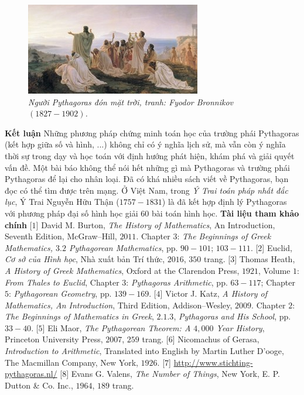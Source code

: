 \begin{multicols}{2}
\begin{figure}[H]
		\centering
		\captionsetup{labelformat= empty, justification=centering}
		\includegraphics[width= 1\linewidth]{17}
		\caption{\small\textit{\color{lichsutoanhoc}Người Pythagoras đón mặt trời, 
				tranh: Fyodor Bronnikov $(1827-1902)$.}}
		\vspace*{-10pt}
	\end{figure}
	\textbf{\color{lichsutoanhoc}Kết luận}
	\vskip 0.1cm
	Những phương pháp chứng minh toán học của trường phái Pythagoras (kết hợp giữa số và hình, ...) không chỉ có ý nghĩa lịch sử, mà vẫn còn ý nghĩa thời sự trong dạy và học toán với định hướng phát hiện, khám phá và giải quyết vấn đề. Một bài báo không thể nói hết những gì mà Pythagoras và trường phái Pythagoras để lại cho nhân loại. Đã có khá nhiều sách viết về Pythagoras, bạn đọc có thể tìm được trên mạng. 
	\vskip 0.1cm 
	Ở Việt Nam, trong \textit{Ý Trai toán pháp nhất đắc lục}, Ý Trai Nguyễn Hữu Thận ($1757-1831$) là đã kết hợp định lý Pythagoras với phương pháp đại số hình học giải $60$ bài toán hình học. 
	\vskip 0.1cm
	\textbf{\color{lichsutoanhoc}Tài liệu tham khảo chính}
	\vskip 0.1cm
	[$1$] David M. Burton, \textit{The History of Mathematics}, An Introduction, Seventh Edition, McGraw--Hill, $2011$. Chapter $3$: \textit{The Beginnings of Greek Mathematics, $3.2$ Pythagorean Mathematics}, pp. $90-101$; $103-111$.
	\vskip 0.1cm
	[$2$] Euclid, \textit{Cơ sở của Hình học}, Nhà xuất bản Trí thức, $2016$, $350$ trang.
	\vskip 0.1cm
	[$3$] Thomas Heath, \textit{A History of Greek Mathematics}, Oxford at the Clarendon Press, $1921$, Volume $1$: \textit{From Thales to Euclid}, Chapter $3$: \textit{Pythagoras Arithmetic}, pp. $63-117$; Chapter $5$: \textit{Pythagorean Geometry}, pp. $139-169$.   
	\vskip 0.1cm
	[$4$] Victor J. Katz, \textit{A History of Mathematics, An Introduction}, Third Edition, Addison--Wesley, $2009$. Chapter $2$: \textit{The Beginnings of Mathematics in Greek}, $2.1.3$, \textit{Pythagoras and His School}, pp. $33-40$.
	\vskip 0.1cm
	[$5$] Eli Maor, \textit{The Pythagorean Theorem: A $4{,}000$ Year History}, Princeton University Press, $2007$, $259$ trang.
	\vskip 0.1cm
	[$6$] Nicomachus of Gerasa, \textit{Introduction to Arithmetic}, Translated into English by Martin Luther D’ooge, The Macmillan Company, New York, $1926$.
	\vskip 0.1cm
	[$7$]  \url{http://www.stichting-pythagoras.nl/}
	\vskip 0.1cm
	[$8$] Evans G. Valens, \textit{The Number of Things}, New York, E. P. Dutton \& Co. Inc., $1964$, $189$ trang.
\end{multicols}

